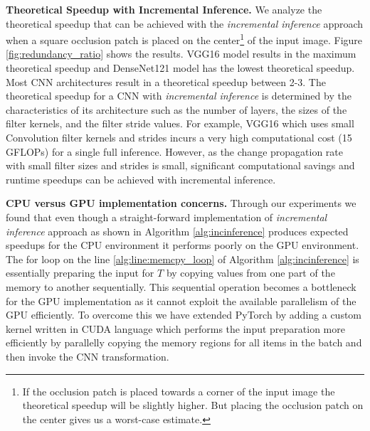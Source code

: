 \vspace{2mm}
\noindent \textbf{Theoretical Speedup with Incremental Inference.}
We analyze the theoretical speedup that can be achieved with the \textit{incremental inference} approach when a square occlusion patch is placed on the center\footnote{If the occlusion patch is placed towards a corner of the input image the theoretical speedup will be slightly higher.
But placing the occlusion patch on the center gives us a worst-case estimate.} of the input image.
Figure \ref{fig:redundancy_ratio} shows the results.
VGG16 model results in the maximum theoretical speedup and DenseNet121 model has the lowest theoretical speedup.
Most CNN architectures result in a theoretical speedup between 2-3.
The theoretical speedup for a CNN with \textit{incremental inference} is determined by the characteristics of its architecture such as the number of layers, the sizes of the filter kernels, and the filter stride values.
For example, VGG16 which uses small Convolution filter kernels and strides incurs a very high computational cost (15 GFLOPs) for a single full inference.
However, as the change propagation rate with small filter sizes and strides is small, significant computational savings and runtime speedups can be achieved with incremental inference.


\vspace{2mm}
\noindent \textbf{CPU versus GPU implementation concerns.}
Through our experiments we found that even though a straight-forward implementation of \textit{incremental inference} approach as shown in Algorithm \ref{alg:incinference} produces expected speedups for the CPU environment it performs poorly on the GPU environment.
The for loop on the line \ref{alg:line:memcpy_loop} of Algorithm \ref{alg:incinference} is essentially preparing the input for $T$ by copying values from one part of the memory to another sequentially.
This sequential operation becomes a bottleneck for the GPU implementation as it cannot exploit the available parallelism of the GPU efficiently.
To overcome this we have extended PyTorch by adding a custom kernel written in CUDA language which performs the input preparation more efficiently by parallelly copying the memory regions for all items in the batch and then invoke the CNN transformation.

